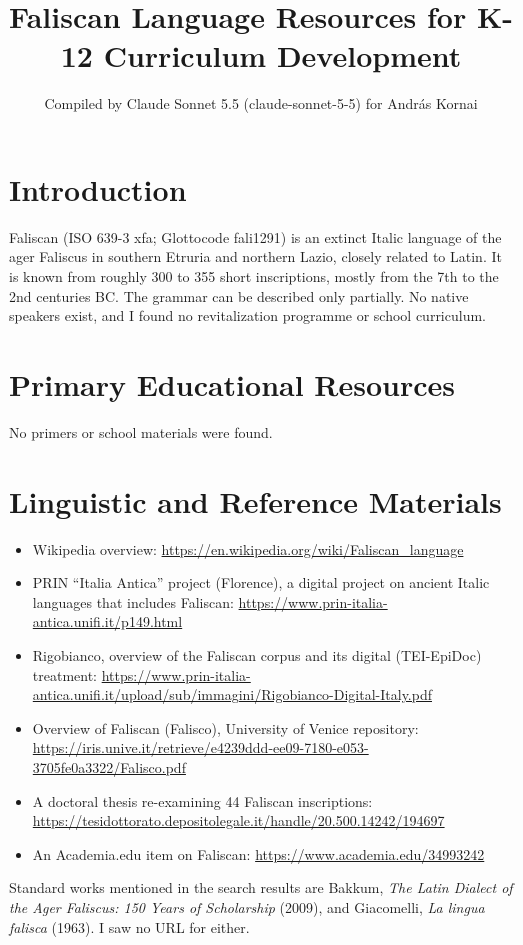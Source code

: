 \documentclass[12pt]{article}
\title{Faliscan Language Resources for K-12 Curriculum Development}
\author{Compiled by Claude Sonnet 5.5 (claude-sonnet-5-5) for Andr\'as Kornai}
\date{}
\begin{document}
\maketitle

\section{Introduction}
Faliscan (ISO 639-3 xfa; Glottocode fali1291) is an extinct Italic language of the ager Faliscus in southern Etruria and northern Lazio, closely related to Latin. It is known from roughly 300 to 355 short inscriptions, mostly from the 7th to the 2nd centuries BC. The grammar can be described only partially. No native speakers exist, and I found no revitalization programme or school curriculum.

\section{Primary Educational Resources}
No primers or school materials were found.

\section{Linguistic and Reference Materials}
\begin{itemize}
\item Wikipedia overview: \url{https://en.wikipedia.org/wiki/Faliscan_language}
\item PRIN ``Italia Antica'' project (Florence), a digital project on ancient Italic languages that includes Faliscan: \url{https://www.prin-italia-antica.unifi.it/p149.html}
\item Rigobianco, overview of the Faliscan corpus and its digital (TEI-EpiDoc) treatment: \url{https://www.prin-italia-antica.unifi.it/upload/sub/immagini/Rigobianco-Digital-Italy.pdf}
\item Overview of Faliscan (Falisco), University of Venice repository: \url{https://iris.unive.it/retrieve/e4239ddd-ee09-7180-e053-3705fe0a3322/Falisco.pdf}
\item A doctoral thesis re-examining 44 Faliscan inscriptions: \url{https://tesidottorato.depositolegale.it/handle/20.500.14242/194697}
\item An Academia.edu item on Faliscan: \url{https://www.academia.edu/34993242}
\end{itemize}
Standard works mentioned in the search results are Bakkum, \emph{The Latin Dialect of the Ager Faliscus: 150 Years of Scholarship} (2009), and Giacomelli, \emph{La lingua falisca} (1963). I saw no URL for either.
\end{document}
